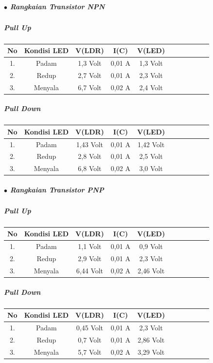 \documentclass[12pt,a4paper]{article}
\begin{document}
\subparagraph*{$\bullet$ Rangkaian Transistor NPN }
\subparagraph*{Pull Up}
\begin{tabular}{|c|c|c|c|c|c|c|c|c|c|c|}        \hline
No & Kondisi LED & V(LDR)   & I(C)     & V(LED)    \\ \hline 
1. & Padam       & 1,3 Volt & 0,01 A & 1,3 Volt  \\ \hline
2. & Redup       & 2,7 Volt & 0,01 A & 2,3 Volt  \\ \hline
3. & Menyala     & 6,7 Volt & 0,02 A & 2,4 Volt  \\ \hline
 \end{tabular}
\subparagraph*{Pull Down}
\begin{tabular}{|c|c|c|c|c|c|c|c|c|c|c|}        \hline
No & Kondisi LED & V(LDR)    & I(C)   & V(LED)    \\ \hline 
1. & Padam       & 1,43 Volt & 0,01 A & 1,42 Volt  \\ \hline
2. & Redup       & 2,8 Volt  & 0,01 A & 2,5 Volt  \\ \hline
3. & Menyala     & 6,8 Volt  & 0,02 A & 3,0 Volt  \\ \hline
 \end{tabular}

\subparagraph*{$\bullet$ Rangkaian Transistor PNP }
\subparagraph*{Pull Up}
\begin{tabular}{|c|c|c|c|c|c|c|c|c|c|c|}        \hline
No & Kondisi LED & V(LDR)    & I(C)     & V(LED)    \\ \hline 
1. & Padam       & 1,1 Volt  & 0,01 A & 0,9  Volt  \\ \hline
2. & Redup       & 2,9 Volt  & 0,01 A & 2,3  Volt  \\ \hline
3. & Menyala     & 6,44 Volt & 0,02 A & 2,46 Volt  \\ \hline
 \end{tabular}
\subparagraph*{Pull Down}
\begin{tabular}{|c|c|c|c|c|c|c|c|c|c|c|}        \hline
No & Kondisi LED & V(LDR)     & I(C)   & V(LED)    \\ \hline 
1. & Padam       & 0,45 Volt  & 0,01 A & 2,3  Volt  \\ \hline
2. & Redup       & 0,7  Volt  & 0,01 A & 2,86 Volt  \\ \hline
3. & Menyala     & 5,7  Volt  & 0,02 A & 3,29 Volt  \\ \hline
 \end{tabular}
\end{document}
